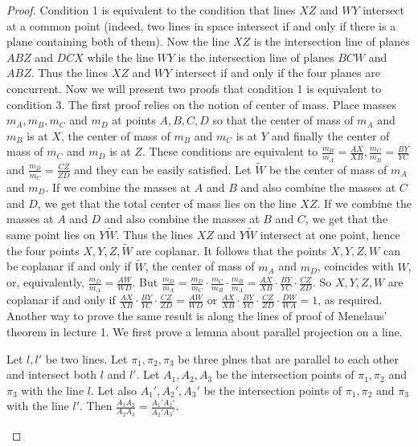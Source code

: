 \begin{proof}
Condition 1 is equivalent to the condition that lines $XZ$ and $WY$ intersect at a common point (indeed, two lines in space intersect if and only if there is a plane containing both of them). Now the line $XZ$ is the intersection line of planes $ABZ$ and $DCX$ while the line $WY$ is the intersection line of planes $BCW$ and $ABZ$. Thus the lines $XZ$ and $WY$ intersect if and only if the four planes are concurrent.
Now we will present two proofs that condition 1 is equivalent to condition 3. The first proof relies on the notion of center of mass.
Place masses $m_A,m_B,m_C$ and $m_D$ at points $A,B,C,D$ so that the center of mass of $m_A$ and $m_B$ is at $X$, the center of mass of $m_B$ and $m_C$ is at $Y$ and finally the center of mass of $m_C$ and $m_D$ is at $Z$. These conditions are equivalent to $\frac{m_B}{m_A}=\frac{AX}{XB},\frac{m_C}{m_B}=\frac{BY}{YC}$ and $\frac{m_D}{m_C}=\frac{CZ}{ZD}$ and they can be easily satisfied. Let $\tilde{W}$ be the center of mass of $m_A$ and $m_D$.
If we combine the masses at $A$ and $B$ and also combine the masses at $C$ and $D$, we get that the total center of mass lies on the line $XZ$. If we combine the masses at $A$ and $D$ and also combine the masses at $B$ and $C$, we get that the same point lies on $Y\tilde{W}$.
Thus the lines $XZ$ and $Y\tilde{W}$ intersect at one point, hence the four points $X,Y,Z,\tilde{W}$ are coplanar.
It follows that the points $X,Y,Z,W$ can be coplanar if and only if $\tilde{W}$, the center of mass of $m_A$ and $m_D$, coincides with $W$, or, equivalently, $\frac{m_D}{m_A}=\frac{AW}{WD}$. But $\frac{m_D}{m_A}=\frac{m_D}{m_C}\cdot\frac{m_C}{m_B}\cdot\frac{m_B}{m_A}=\frac{AX}{XB}\cdot\frac{BY}{YC}\cdot\frac{CZ}{ZD}$. So $X,Y,Z,W$ are coplanar if and only if $\frac{AX}{XB}\cdot\frac{BY}{YC}\cdot\frac{CZ}{ZD}=\frac{AW}{WD}$ or $\frac{AX}{XB}\cdot\frac{BY}{YC}\cdot\frac{CZ}{ZD}\cdot\frac{DW}{WA}=1$, as required.
Another way to prove the same result is along the lines of proof of Menelaus' theorem in lecture 1. We first prove a lemma about parallel projection on a line.

\begin{lemma}
Let $l,l'$ be two lines. Let $\pi_1,\pi_2,\pi_3$ be three plnes that are parallel to each other and intersect both $l$ and $l'$. Let $A_1,A_2,A_3$ be the intersection points of $\pi_1,\pi_2$ and $\pi_3$ with the line $l$. Let also $A_1',A_2',A_3'$ be the intersection points of $\pi_1,\pi_2$ and $\pi_3$ with the line $l'$. Then $\frac{A_1A_2}{A_2A_3}=\frac{A_1'A_2'}{A_2'A_3'}$.

\end{lemma}
\end{proof}
